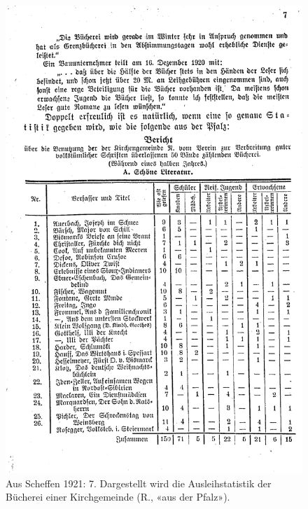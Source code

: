 \documentclass[a4paper,
fontsize=11pt,
oneside,
numbers=noperiodatend,
parskip=half-,
bibliography=totoc,
final
]{scrartcl}
\begin{document}
\begin{figure}
\centering
\includegraphics{img/scheffen_statistik_1.jpg}
\caption{Aus Scheffen 1921: 7. Dargestellt wird die Ausleihstatistik der
Bücherei einer Kirchgemeinde (R., «aus der Pfalz»).}
\end{figure}
\end{document}

